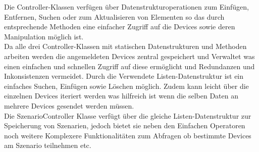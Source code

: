 Die Controller-Klassen verfügen über Datenstrukturoperationen zum Einfügen, Entfernen, Suchen oder zum Aktualisieren von Elementen
so das durch entsprechende Methoden eine einfacher Zugriff auf die Devices sowie deren Manipulation möglich ist. \\
Da alle drei Controller-Klassen mit statischen Datenstrukturen und Methoden arbeiten werden die angemeldeten Devices zentral 
gespeichert und Verwaltet was einen einfachen und schnellen Zugriff auf diese ermöglicht und Redundanzen und Inkonsistenzen vermeidet.
Durch die Verwendete Listen-Datenstruktur ist ein einfaches Suchen, Einfügen sowie Löschen möglich. Zudem kann leicht über die 
einzelnen Devices iteriert werden was hilfreich ist wenn die selben Daten an mehrere Devices gesendet werden müssen.
\\
Die SzenarioController Klasse verfügt über die gleiche Listen-Datenstruktur zur Speicherung von Szenarien, jedoch bietet sie neben
den Einfachen Operatoren noch weitere Komplexere Funktionalitäten zum Abfragen ob bestimmte Devices am Szenario teilnehmen etc. 
